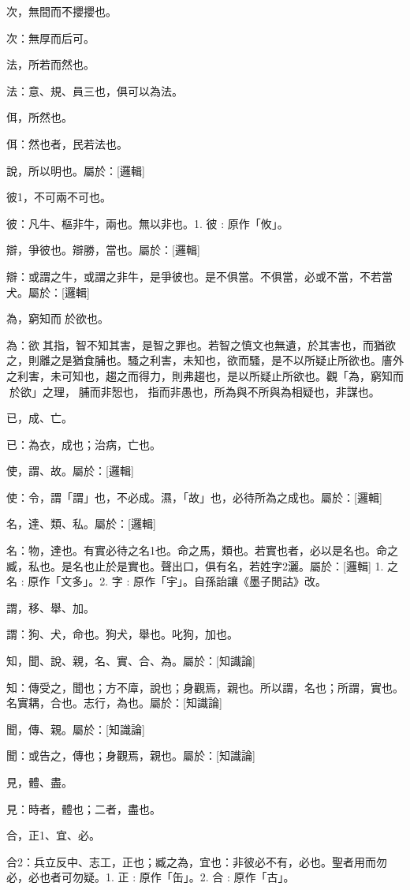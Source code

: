 \begin{pinyinscope}
次，無間而不攖攖也。

次：無厚而后可。

法，所若而然也。

法：意、規、員三也，俱可以為法。

佴，所然也。

佴：然也者，民若法也。

說，所以明也。屬於：[邏輯]



彼1，不可兩不可也。

彼：凡牛、樞非牛，兩也。無以非也。1. 彼 : 原作「攸」。

辯，爭彼也。辯勝，當也。屬於：[邏輯]

辯：或謂之牛，或謂之非牛，是爭彼也。是不俱當。不俱當，必或不當，不若當犬。屬於：[邏輯]

為，窮知而𠐴於欲也。

為：欲𩁥其指，智不知其害，是智之罪也。若智之慎文也無遺，於其害也，而猶欲𩁥之，則離之是猶食脯也。騷之利害，未知也，欲而騷，是不以所疑止所欲也。廧外之利害，未可知也，趨之而得力，則弗趨也，是以所疑止所欲也。觀「為，窮知而𠐴於欲」之理，𩁥脯而非𢜔也，𩁥指而非愚也，所為與不所與為相疑也，非謀也。

已，成、亡。

已：為衣，成也；治病，亡也。

使，謂、故。屬於：[邏輯]

使：令，謂「謂」也，不必成。濕，「故」也，必待所為之成也。屬於：[邏輯]

名，達、類、私。屬於：[邏輯]

名：物，達也。有實必待之名1也。命之馬，類也。若實也者，必以是名也。命之臧，私也。是名也止於是實也。聲出口，俱有名，若姓字2灑。屬於：[邏輯] 
1. 之名 : 原作「文多」。2. 字 : 原作「宇」。自孫詒讓《墨子閒詁》改。

謂，移、舉、加。

謂：狗、犬，命也。狗犬，舉也。叱狗，加也。

知，聞、說、親，名、實、合、為。屬於：[知識論]

知：傳受之，聞也；方不㢓，說也；身觀焉，親也。所以謂，名也；所謂，實也。名實耦，合也。志行，為也。屬於：[知識論]

聞，傳、親。屬於：[知識論]

聞：或告之，傳也；身觀焉，親也。屬於：[知識論]

見，體、盡。

見：時者，體也；二者，盡也。

合，正1、宜、必。

合2：兵立反中、志工，正也；臧之為，宜也：非彼必不有，必也。聖者用而勿必，必也者可勿疑。1. 正 : 原作「缶」。2. 合 : 原作「古」。


\end{pinyinscope}
